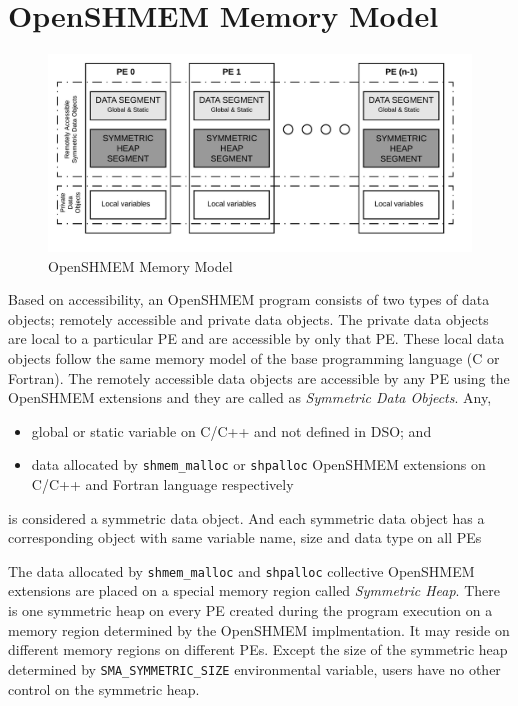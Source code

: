 \section{OpenSHMEM Memory Model}
\label{src:mmodel}
\begin{figure}[!h]
    \vspace{-20pt}
    \hspace*{5mm}
    \includegraphics[scale=0.20]{image/osm-mmodel.png}
    \vspace{-25pt}
    \caption{OpenSHMEM Memory Model}
    \label{fig:mmodel}
\end{figure}

Based on accessibility, an OpenSHMEM program consists of two types of data
objects; remotely accessible and private data objects. The private data objects
are local to a particular PE and are accessible by only that PE.
These local data objects follow the same memory model of the base programming
language (C or Fortran). The remotely accessible data objects are accessible
by any PE using the OpenSHMEM extensions and they are called as \emph{Symmetric
Data Objects}. Any,
\begin{itemize}
    \item global or static variable on C/C++ and not defined in DSO; and
    \item data allocated by \texttt{shmem\_malloc} or \texttt{shpalloc}
    OpenSHMEM extensions on C/C++ and Fortran language respectively
\end{itemize}
is considered a symmetric data object. And each symmetric data object has a
corresponding object with same variable name, size and data type on all PEs

The data allocated by \texttt{shmem\_malloc} and \texttt{shpalloc} collective
OpenSHMEM extensions are placed on a special memory region called \emph{Symmetric
Heap}. There is one symmetric heap on every PE created during the program execution
on a memory region determined by the OpenSHMEM implmentation. It may reside on
different memory regions on different PEs. Except the size of the symmetric heap
determined by \texttt{SMA\_SYMMETRIC\_SIZE} environmental variable, users have no
other control on the symmetric heap.

